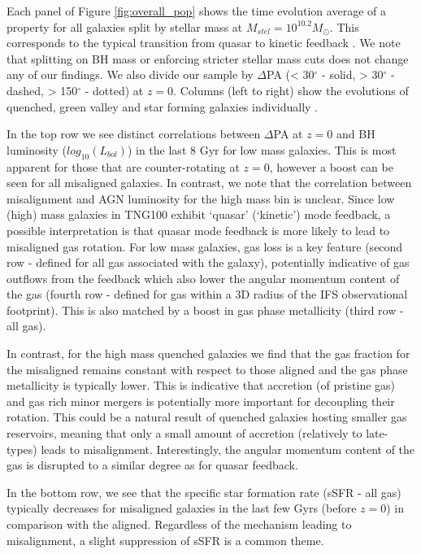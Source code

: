 \documentclass[fleqn,usenatbib]{mnras}
\begin{document}
Each panel of Figure \ref{fig:overall_pop} shows the time evolution average of a property for all galaxies split by stellar mass at $M_{stel} = 10^{10.2}M_{\odot}$. This corresponds to the typical transition from quasar to kinetic feedback \citep[i.e. $M_{BH} \approx 10^{8}M_{\odot}$, see Fig 1 in][]{li2019}. We note that splitting on BH mass or enforcing stricter stellar mass cuts does not change any of our findings. We also divide our sample by $\Delta$PA (< 30$^{\circ}$ - solid, > 30$^{\circ}$ - dashed, > 150$^{\circ}$ - dotted) at $z=0$. Columns (left to right) show the evolutions of quenched, green valley and star forming galaxies individually \cite[defined by deviation from the star forming main-sequence in][]{pillepich2019}. 

In the top row we see distinct correlations between $\Delta$PA at $z=0$ and BH luminosity ($log_{10}(L_{bol})$) in the last 8 Gyr for low mass galaxies. This is most apparent for those that are counter-rotating at $z=0$, however a boost can be seen for all misaligned galaxies. In contrast, we note that the correlation between misalignment and AGN luminosity for the high mass bin is unclear. Since low (high) mass galaxies in TNG100 exhibit `quasar' (`kinetic') mode feedback, a possible interpretation is that quasar mode feedback is more likely to lead to misaligned gas rotation. For low mass galaxies, gas loss is a key feature (second row - defined for all gas associated with the galaxy), potentially indicative of gas outflows from the feedback which also lower the angular momentum content of the gas (fourth row - defined for gas within a 3D radius of the IFS observational footprint). This is also matched by a boost in gas phase metallicity (third row - all gas).

In contrast, for the high mass quenched galaxies we find that the gas fraction for the misaligned remains constant with respect to those aligned and the gas phase metallicity is typically lower. This is indicative that accretion (of pristine gas) and gas rich minor mergers is potentially more important for decoupling their rotation. This could be a natural result of quenched galaxies hosting smaller gas reservoirs, meaning that only a small amount of accretion (relatively to late-types) leads to misalignment. Interestingly, the angular momentum content of the gas is disrupted to a similar degree as for quasar feedback. 

In the bottom row, we see that the specific star formation rate (sSFR - all gas) typically decreases for misaligned galaxies in the last few Gyrs (before $z=0$) in comparison with the aligned. Regardless of the mechanism leading to misalignment, a slight suppression of sSFR is a common theme.
\end{document}
